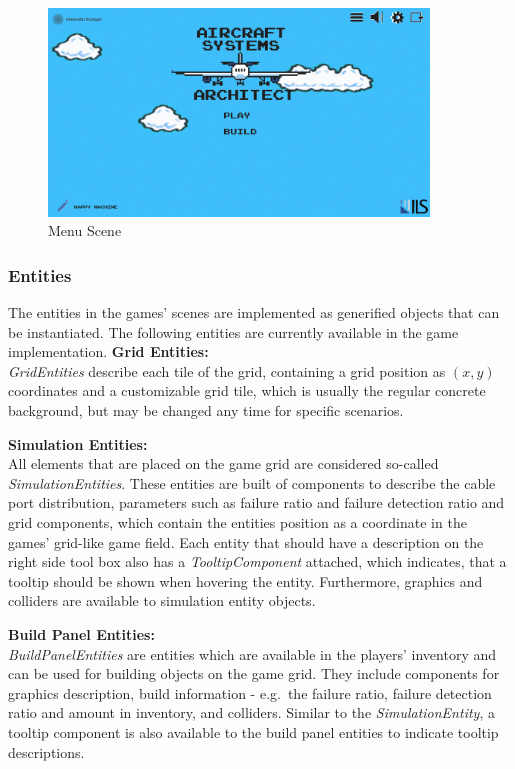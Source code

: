 \begin{figure}
    \centering
        \includegraphics[width=0.9\textwidth]{Pictures/res/implementation/scenes/main-menu}
    \caption{Menu Scene}
    \label{fig:menu-scene}
\end{figure}

\subsubsection{Entities}\label{subsubsec:entities2}
The entities in the games' scenes are implemented as generified objects that can be instantiated.
The following entities are currently available in the game implementation.
\textbf{Grid Entities:} \\
\textit{GridEntities} describe each tile of the grid, containing a grid position as $(x,y)$ coordinates and a customizable grid tile,
which is usually the regular concrete background, but may be changed any time for specific scenarios.

\textbf{Simulation Entities:} \\
All elements that are placed on the game grid are considered so-called \textit{SimulationEntities}.
These entities are built of components to describe the cable port distribution, parameters such as failure ratio and failure detection ratio and grid components, which contain the
entities position as a coordinate in the games' grid-like game field.
Each entity that should have a description on the right side tool box also has a \textit{TooltipComponent} attached, which indicates, that
a tooltip should be shown when hovering the entity.
Furthermore, graphics and colliders are available to simulation entity objects.

\textbf{Build Panel Entities:} \\
\textit{BuildPanelEntities} are entities which are available in the players' inventory and can be used for building objects on the game grid.
They include components for graphics description, build information - e.g.\ the failure ratio, failure detection ratio and amount in inventory,
and colliders.
Similar to the \textit{SimulationEntity}, a tooltip component is also available to the build panel entities to indicate tooltip descriptions.
